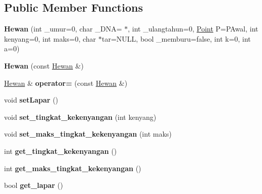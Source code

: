 \subsection*{Public Member Functions}
\begin{DoxyCompactItemize}
\item 
{\bfseries Hewan} (int \+\_\+umur=0, char \+\_\+\+D\+NA= \textquotesingle{}$\ast$\textquotesingle{}, int \+\_\+ulangtahun=0, \hyperlink{class_point}{Point} P=P\+Awal, int kenyang=0, int maks=0, char $\ast$tar=N\+U\+LL, bool \+\_\+memburu=false, int k=0, int a=0)\hypertarget{class_hewan_a6b148b7d2380f746f2c7943d9adc4e15}{}\label{class_hewan_a6b148b7d2380f746f2c7943d9adc4e15}

\item 
{\bfseries Hewan} (const \hyperlink{class_hewan}{Hewan} \&)\hypertarget{class_hewan_a9a7e8b448780d0ebff93d06d82c77795}{}\label{class_hewan_a9a7e8b448780d0ebff93d06d82c77795}

\item 
\hyperlink{class_hewan}{Hewan} \& {\bfseries operator=} (const \hyperlink{class_hewan}{Hewan} \&)\hypertarget{class_hewan_ae6fca2e8de85c914a6ac040a9aea3d58}{}\label{class_hewan_ae6fca2e8de85c914a6ac040a9aea3d58}

\item 
void {\bfseries set\+Lapar} ()\hypertarget{class_hewan_a488b6dde625a4b75f0014856ce5f7a47}{}\label{class_hewan_a488b6dde625a4b75f0014856ce5f7a47}

\item 
void {\bfseries set\+\_\+tingkat\+\_\+kekenyangan} (int kenyang)\hypertarget{class_hewan_a54587f410e4a417aa48baad66e3abeab}{}\label{class_hewan_a54587f410e4a417aa48baad66e3abeab}

\item 
void {\bfseries set\+\_\+maks\+\_\+tingkat\+\_\+kekenyangan} (int maks)\hypertarget{class_hewan_aff60666bdcd276a6d5538905e8132a8e}{}\label{class_hewan_aff60666bdcd276a6d5538905e8132a8e}

\item 
int {\bfseries get\+\_\+tingkat\+\_\+kekenyangan} ()\hypertarget{class_hewan_abf1d8353674e5f68018a68f17804ea96}{}\label{class_hewan_abf1d8353674e5f68018a68f17804ea96}

\item 
int {\bfseries get\+\_\+maks\+\_\+tingkat\+\_\+kekenyangan} ()\hypertarget{class_hewan_ac8d2313e06af76164b7ce143489596f7}{}\label{class_hewan_ac8d2313e06af76164b7ce143489596f7}

\item 
bool {\bfseries get\+\_\+lapar} ()\hypertarget{class_hewan_a79068d1eb649c561b12a92a5de159601}{}\label{class_hewan_a79068d1eb649c561b12a92a5de159601}


\end{DoxyCompactItemize}
